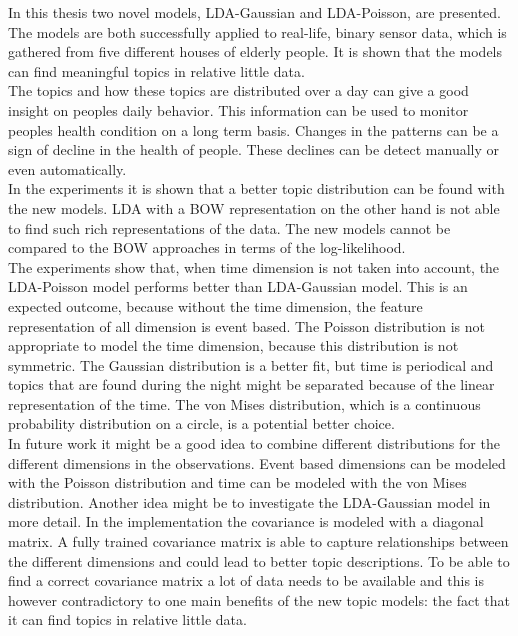 In this thesis two novel models, LDA-Gaussian and LDA-Poisson, are presented. The models are both successfully applied to real-life, binary  sensor data, which is gathered from five different houses of elderly people. It is shown that the models can find meaningful topics in relative little data.\\

The topics and how these topics are distributed over a day can give a good insight on peoples daily behavior. This information can be used to monitor peoples health condition on a long term basis. Changes in the patterns can be a sign of decline in the health of people. These declines can be detect manually or even automatically.\\

In the experiments it is shown that a better topic distribution can be found with the new models. LDA with a BOW representation on the other hand is not able to find such rich representations of the data. The new models cannot be compared to the BOW approaches in terms of the log-likelihood.\\

The experiments show that, when time dimension is not taken into account, the LDA-Poisson model performs better than LDA-Gaussian model. This is an expected outcome, because without the time dimension, the feature representation of all dimension is event based. The Poisson distribution is not appropriate to model the time dimension, because this distribution is not symmetric. The Gaussian distribution is a better fit, but time is periodical and topics that are found during the night might be separated because of the linear representation of the time. The von Mises distribution, which is a continuous probability distribution on a circle, is a potential better choice.\\

In future work it might be a good idea to combine different distributions for the different dimensions in the observations. Event based dimensions can be modeled with the Poisson distribution and time can be modeled with the von Mises distribution.
Another idea might be to investigate the LDA-Gaussian model in more detail. In the implementation the covariance is modeled with a diagonal matrix. A fully trained covariance matrix is able to capture relationships between the different dimensions and could lead to better topic descriptions. To be able to find a correct covariance matrix a lot of data needs to be available and this is however contradictory to one main benefits of the new topic models: the fact that it can find topics in relative little data. \\

